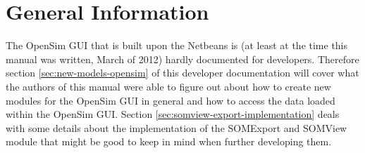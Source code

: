 \documentclass[a4paper]{scrartcl}
\begin{document}
\tableofcontents
\newpage

\section{General Information}
The OpenSim GUI that is built upon the Netbeans is (at least at the time this manual was written, March of 2012) hardly documented for developers.
Therefore section \ref{sec:new-models-opensim} of this developer documentation will cover what the authors of this manual were able to figure out about how to create new modules for the OpenSim GUI in general and how to access the data loaded within the OpenSim GUI.
Section \ref{sec:somview-export-implementation} deals with some details about the implementation of the SOMExport and SOMView module that might be good to keep in mind when further developing them.
\end{document}
